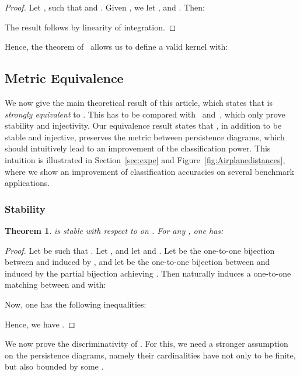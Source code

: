\documentclass[11pt]{article}
\newtheorem{thm}{Theorem}[section]
\begin{document}
\begin{proof}

Let ,  such that  and .
Given , we let 
, 
 and .
Then:
  
The result follows by linearity of integration.







\end{proof}

Hence, the theorem of~\cite{Berg84}
allows us to define a valid kernel with: 




\subsection{Metric Equivalence}


We now give the main theoretical result of
this article, which states that  is {\em strongly equivalent} to .  
This has to be compared with~\cite{Reininghaus15} and~\cite{Kusano16}, which
only prove stability and injectivity. Our equivalence result
states that , in addition to be stable
and injective, preserves the metric between persistence diagrams, which should
intuitively lead to an improvement of the classification power. This
intuition is illustrated in Section~\ref{sec:expe} and
Figure~\ref{fig:Airplanedistances}, where we show an improvement of
classification accuracies on several benchmark applications.

\subsubsection{Stability}

\begin{thm}\label{th:stab}
  is stable with respect to  on .
For any , one has: 
\end{thm}

\begin{proof}
Let  be such that . Let , and
let  and 
. Let  be the one-to-one bijection between  and 
induced by , and
let  be the 
one-to-one bijection between  and 
induced by the partial bijection achieving .
Then  naturally induces a one-to-one matching 
between  and  with:


Now, one has the following inequalities:


Hence, we have
.
\end{proof}

We now prove the discriminativity of .
For this, we need a stronger assumption on the persistence diagrams, namely their cardinalities have not only to be finite, but also bounded
by some .
\end{document}

